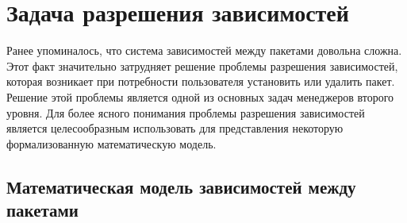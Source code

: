 \section{Задача разрешения зависимостей}
Ранее упоминалось, что система зависимостей между пакетами довольна сложна. Этот факт 
значительно затрудняет решение проблемы разрешения зависимостей, которая возникает
при потребности пользователя установить или удалить пакет. Решение этой проблемы является одной
из основных задач менеджеров второго уровня.
Для более ясного понимания проблемы разрешения зависимостей является целесообразным использовать
для представления некоторую формализованную математическую модель.

\subsection{Математическая модель зависимостей между пакетами}
\label{sn:software_dependencies_model}

